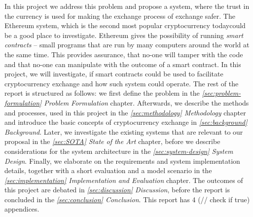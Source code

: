 In this project we address this problem and propose a system, where the trust in the currency is used for making the exchange process of exchange safer. The Ethereum system, which is the second most popular cryptocurrency today\footnotemark could be a good place to investigate. Ethereum gives the possibility of running \emph{smart contracts} -- small programs that are run by many computers around the world at the same time. This provides assurance, that no-one will tamper with the code and that no-one can manipulate with the outcome of a smart contract. 
% 
% 
In this project, we will investigate, if smart contracts could be used to facilitate cryptocurrency exchange and how such system could operate. The rest of the report is structured as follows: we first define the problem in the \textit{\ref{sec:problem-formulation} Problem Formulation} chapter. Afterwards, we describe the methods and processes, used in this project in the \textit{\ref{sec:methodology} Methodology} chapter and introduce the basic concepts of cryptocurrency exchange in \textit{\ref{sec:background} Background}. Later, we investigate the existing systems that are relevant to our proposal in the \textit{\ref{sec:SOTA} State of the Art} chapter, before we describe considerations for the system architecture in the \textit{\ref{sec:system-design} System Design}. Finally, we elaborate on the requirements and system implementation details, together with a short evaluation and a model scenario in the \textit{\ref{sec:implementation} Implementation and Evaluation} chapter. The outcomes of this project are debated in \textit{\ref{sec:discussion} Discussion}, before the report is concluded in the \textit{\ref{sec:conclusion} Conclusion}. This report has 4 (// check if true) appendices.
